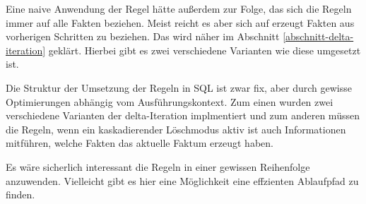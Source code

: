 Eine naive Anwendung der Regel hätte außerdem zur Folge, das sich die Regeln immer auf alle Fakten beziehen. Meist reicht es aber sich auf erzeugt Fakten aus vorherigen Schritten zu beziehen. Das wird näher im Abschnitt \ref{abschnitt-delta-iteration} geklärt. Hierbei gibt es zwei verschiedene Varianten wie diese umgesetzt ist.

Die Struktur der Umsetzung der Regeln in SQL ist zwar fix, aber durch gewisse Optimierungen abhängig vom Ausführungskontext. Zum einen wurden zwei verschiedene Varianten der delta-Iteration implmentiert und zum anderen müssen die Regeln, wenn ein kaskadierender Löschmodus aktiv ist auch Informationen mitführen, welche Fakten das aktuelle Faktum erzeugt haben.

Es wäre sicherlich interessant die Regeln in einer gewissen Reihenfolge anzuwenden. Vielleicht gibt es hier eine Möglichkeit eine effzienten Ablaufpfad zu finden.